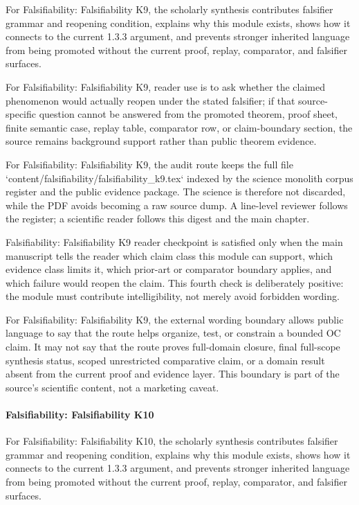 For Falsifiability: Falsifiability K9, the scholarly synthesis contributes falsifier grammar and reopening condition, explains why this module exists, shows how it connects to the current 1.3.3 argument, and prevents stronger inherited language from being promoted without the current proof, replay, comparator, and falsifier surfaces.


For Falsifiability: Falsifiability K9, reader use is to ask whether the claimed phenomenon would actually reopen under the stated falsifier; if that source-specific question cannot be answered from the promoted theorem, proof sheet, finite semantic case, replay table, comparator row, or claim-boundary section, the source remains background support rather than public theorem evidence.


For Falsifiability: Falsifiability K9, the audit route keeps the full file `content/falsifiability/falsifiability\_k9.tex` indexed by the science monolith corpus register and the public evidence package. The science is therefore not discarded, while the PDF avoids becoming a raw source dump. A line-level reviewer follows the register; a scientific reader follows this digest and the main chapter.


Falsifiability: Falsifiability K9 reader checkpoint is satisfied only when the main manuscript tells the reader which claim class this module can support, which evidence class limits it, which prior-art or comparator boundary applies, and which failure would reopen the claim. This fourth check is deliberately positive: the module must contribute intelligibility, not merely avoid forbidden wording.


For Falsifiability: Falsifiability K9, the external wording boundary allows public language to say that the route helps organize, test, or constrain a bounded OC claim. It may not say that the route proves full-domain closure, final full-scope synthesis status, scoped unrestricted comparative claim, or a domain result absent from the current proof and evidence layer. This boundary is part of the source's scientific content, not a marketing caveat.


\paragraph{Falsifiability: Falsifiability K10}

For Falsifiability: Falsifiability K10, the scholarly synthesis contributes falsifier grammar and reopening condition, explains why this module exists, shows how it connects to the current 1.3.3 argument, and prevents stronger inherited language from being promoted without the current proof, replay, comparator, and falsifier surfaces.


